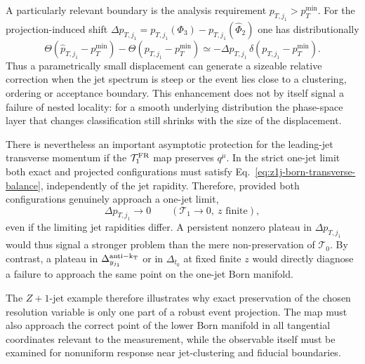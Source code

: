 \documentclass[11pt]{article}
\newcommand{\Ph}{\Phi}
\begin{document}
A particularly relevant boundary is the analysis requirement $p_{T,j_1}>p_T^{\min}$. For the projection-induced
shift $\Delta p_{T,j_1}=p_{T,j_1}(\Ph_3)-p_{T,j_1}(\widehat\Ph_2)$ one has distributionally
\begin{equation}
\Theta\!\left(\widehat p_{T,j_1}-p_T^{\min}\right)
-
\Theta\!\left(p_{T,j_1}-p_T^{\min}\right)
\simeq
-\Delta p_{T,j_1}\,
\delta\!\left(p_{T,j_1}-p_T^{\min}\right).
\label{eq:z1j-pt-threshold-migration}
\end{equation}
Thus a parametrically small displacement can generate a sizeable relative correction when the jet spectrum
is steep or the event lies close to a clustering, ordering or acceptance boundary. This enhancement does not
by itself signal a failure of nested locality: for a smooth underlying distribution the phase-space layer
that changes classification still shrinks with the size of the displacement.

There is nevertheless an important asymptotic protection for the leading-jet transverse momentum if the
$\mathcal T_1^{\rm FR}$ map preserves $q^\mu$. In the strict one-jet limit both exact and projected
configurations must satisfy Eq.~\eqref{eq:z1j-born-transverse-balance}, independently of the jet rapidity.
Therefore, provided both configurations genuinely approach a one-jet limit,
\begin{equation}
\Delta p_{T,j_1}\longrightarrow0
\qquad
(\mathcal T_1\to0,\ z\text{ finite}),
\label{eq:z1j-leading-pt-protected}
\end{equation}
even if the limiting jet rapidities differ. A persistent nonzero plateau in $\Delta p_{T,j_1}$ would thus
signal a stronger problem than the mere non-preservation of $\mathcal T_0$. By contrast, a plateau in
$\Delta_{y_{j_1}}^{\rm anti-k_T}$ or in $\Delta_{t_0}$ at fixed finite $z$ would directly diagnose a failure to
approach the same point on the one-jet Born manifold.

The $Z+1$-jet example therefore illustrates why exact preservation of the chosen resolution variable is only
one part of a robust event projection. The map must also approach the correct point of the lower Born manifold
in all tangential coordinates relevant to the measurement, while the observable itself must be examined for
nonuniform response near jet-clustering and fiducial boundaries.
\end{document}

